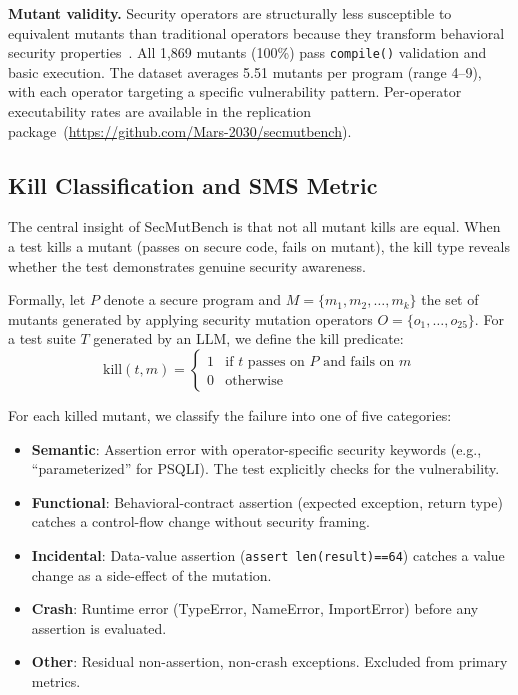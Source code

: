 \documentclass[sigconf,anonymous,review]{acmart}
\begin{document}
\textbf{Mutant validity.} Security operators are structurally less susceptible to equivalent mutants than traditional operators because they transform behavioral security properties~\cite{jia2011analysis,papadakis2019mutation}. All 1,869 mutants (100\%) pass \texttt{compile()} validation and basic execution. The dataset averages 5.51 mutants per program (range 4--9), with each operator targeting a specific vulnerability pattern. Per-operator executability rates are available in the replication package~(\url{https://github.com/Mars-2030/secmutbench}).


\subsection{Kill Classification and SMS Metric}

The central insight of SecMutBench is that not all mutant kills are equal. When a test kills a mutant (passes on secure code, fails on mutant), the kill type reveals whether the test demonstrates genuine security awareness.

Formally, let $P$ denote a secure program and $M = \{m_1, m_2, \ldots, m_k\}$ the set of mutants generated by applying security mutation operators $O = \{o_1, \ldots, o_{25}\}$. For a test suite $T$ generated by an LLM, we define the kill predicate:
\begin{equation}
    \text{kill}(t, m) = \begin{cases} 1 & \text{if } t \text{ passes on } P \text{ and fails on } m \\ 0 & \text{otherwise} \end{cases}
\end{equation}

\noindent For each killed mutant, we classify the failure into one of five categories:

\begin{itemize}\setlength{\itemsep}{2pt}
    \item \textbf{Semantic}: Assertion error with operator-specific security keywords (e.g., ``parameterized'' for PSQLI). The test explicitly checks for the vulnerability.
    \item \textbf{Functional}: Behavioral-contract assertion (expected exception, return type) catches a control-flow change without security framing.
    \item \textbf{Incidental}: Data-value assertion (\texttt{assert len(result)==64}) catches a value change as a side-effect of the mutation.
    \item \textbf{Crash}: Runtime error (TypeError, NameError, ImportError) before any assertion is evaluated.
    \item \textbf{Other}: Residual non-assertion, non-crash exceptions. Excluded from primary metrics.
\end{itemize}
\end{document}
